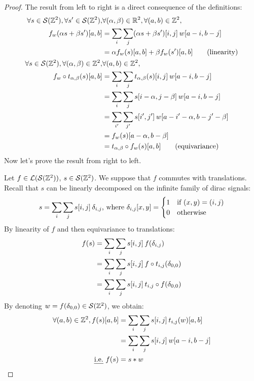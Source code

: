 \begin{proof}
The result from left to right is a direct consequence of the definitions:
\begin{align}
\forall s \in \cs(\bbz^2), \forall s' \in \cs(\bbz^2), & \forall (\alpha, \beta) \in \bbr^2,\forall (a,b) \in \bbz^2,\nonumber\\
 f_w(\alpha s + \beta s')[a,b] & = \displaystyle \sum_i \sum_j (\alpha s + \beta s')[i,j] \h{2} w[a-i, b-j]\nonumber\\
 & = \alpha f_w(s)[a,b] + \beta f_w(s')[a,b] \tag{linearity}\\
\forall s \in \cs(\bbz^2), \forall (\alpha, \beta) \in \bbz^2, & \forall (a,b) \in \bbz^2,\nonumber\\
f_w \circ t_{\alpha,\beta} (s)[a,b] & = \displaystyle \sum_i \sum_j t_{\alpha,\beta}(s)[i,j] \h{2} w[a-i, b-j]\nonumber\\
 & = \displaystyle \sum_i \sum_j s[i - \alpha,j - \beta] \h{2} w[a-i, b-j]\nonumber\\
 & = \displaystyle \sum_{i'} \sum_{j'} s[i',j'] \h{2} w[a - i' - \alpha, b - j'- \beta]\label{eq:bij}\\
 & = f_w (s)[a - \alpha,b - \beta]\nonumber\\
 & = t_{\alpha,\beta} \circ f_w (s)[a,b] \tag{equivariance}
\end{align}
Now let's prove the result from right to left.

Let $f \in \cl(\cs(\bbz^2))$, $s \in \cs(\bbz^2)$. We suppose that $f$ commutes with translations. Recall that $s$ can be linearly decomposed on the infinite family of dirac signals:
\begin{gather*}
s = \displaystyle \sum_i \sum_j s[i,j] \h{2} \delta_{i,j} \text{, where }
\delta_{i,j}[x,y] = \begin{cases} 1 & \text{if } (x,y) = (i,j)\\ 0 & \text{otherwise} \end{cases}
\end{gather*}
By linearity of $f$ and then equivariance to translations:
\begin{align*}
f(s) & = \displaystyle \sum_i \sum_j s[i,j] \h{2} f(\delta_{i,j})\\
 & = \displaystyle \sum_i \sum_j s[i,j] \h{2} f \circ t_{i,j} (\delta_{0,0})\\
 & = \displaystyle \sum_i \sum_j s[i,j] \h{2} t_{i,j} \circ f (\delta_{0,0})
\end{align*}
By denoting $w = f (\delta_{0,0}) \in \cs(\bbz^2)$, we obtain:
\begin{align}
\forall (a,b) \in \bbz^2, f(s)[a,b] & = \displaystyle \sum_i \sum_j s[i,j] \h{2} t_{i,j}(w)[a,b] \label{eq:conv}\\
 & = \displaystyle \sum_i \sum_j s[i,j] \h{2} w[a-i, b-j] \nonumber\\
\text{\ie } f(s) & = s \ast w \nonumber
\end{align}
\end{proof}

